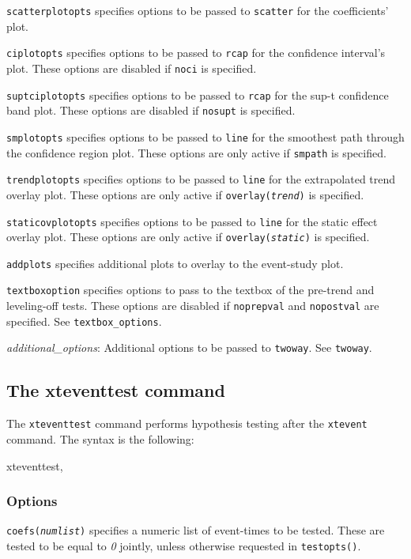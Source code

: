 \documentclass[12pt]{article}
\begin{document}
\hangpara
\texttt{scatterplotopts} specifies options to be passed to \texttt{scatter} for the coefficients' plot.

\hangpara
\texttt{ciplotopts} specifies options to be passed to \texttt{rcap} for the confidence interval's plot.
These options are disabled if \texttt{noci} is specified.

\hangpara
\texttt{suptciplotopts} specifies options to be passed to \texttt{rcap} for the sup-t confidence band plot.
These options are disabled if \texttt{nosupt} is specified.

\hangpara
\texttt{smplotopts} specifies options to be passed to \texttt{line} for the smoothest path through the confidence region plot.
These options are only active if \texttt{smpath} is specified.

\hangpara
\texttt{trendplotopts} specifies options to be passed to \texttt{line} for the extrapolated trend overlay plot.
These options are only active if \texttt{overlay({\it trend})} is specified.

\hangpara
\texttt{staticovplotopts} specifies options to be passed to \texttt{line} for the static effect overlay plot.
These options are only active if \texttt{overlay({\it static})} is specified.

\hangpara
\texttt{addplots} specifies additional plots to overlay to the event-study plot.

\hangpara
\texttt{textboxoption} specifies options to pass to the textbox of the pre-trend and leveling-off tests.
These options are disabled if \texttt{noprepval} and \texttt{nopostval} are specified.
See \texttt{textbox\_options}.

\hangpara
{\it additional\_options}: Additional options to be passed to \texttt{twoway}.
See \texttt{twoway}.

\subsection{The xteventtest command}
The \texttt{xteventtest} command performs hypothesis testing after the \texttt{xtevent} command. The syntax is the following:

\begin{stsyntax}
	xteventtest,
\end{stsyntax}

\subsubsection{Options}
\hangpara
\texttt{coefs({\it numlist})} specifies a numeric list of event-times to be tested. These are tested to be equal to
{\it 0} jointly, unless otherwise requested in \texttt{testopts()}.
\end{document}
